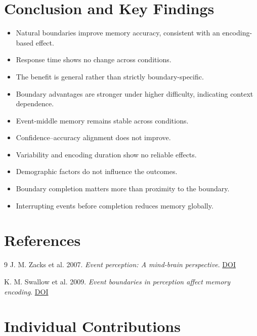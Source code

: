 \documentclass[11pt]{article}
\renewcommand{\arraystretch}{1.1}
\begin{document}
\section{Conclusion and Key Findings}
\begin{itemize}
  \item Natural boundaries improve memory accuracy, consistent with an encoding-based effect.
  \item Response time shows no change across conditions.
  \item The benefit is general rather than strictly boundary-specific.
  \item Boundary advantages are stronger under higher difficulty, indicating context dependence.
  \item Event-middle memory remains stable across conditions.
  \item Confidence--accuracy alignment does not improve.
  \item Variability and encoding duration show no reliable effects.
  \item Demographic factors do not influence the outcomes.
  \item Boundary completion matters more than proximity to the boundary.
  \item Interrupting events before completion reduces memory globally.
\end{itemize}

\section{References}
\balance
\begin{thebibliography}{9}
J. M. Zacks et al. 2007.
\textit{Event perception: A mind-brain perspective}.
\href{https://doi.org/10.1037/0033-2909.133.2.273}{DOI}

K. M. Swallow et al. 2009.
\textit{Event boundaries in perception affect memory encoding}.
\href{https://doi.org/10.1037/a0015637}{DOI}
\end{thebibliography}


\FloatBarrier
\section{Individual Contributions}
\begin{table}[H]
\centering
\small
\renewcommand{\arraystretch}{1.2}
\end{table}
\end{document}
